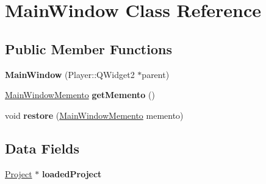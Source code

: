 \hypertarget{classMainWindow}{}\section{Main\+Window Class Reference}
\label{classMainWindow}
\subsection*{Public Member Functions}
\begin{DoxyCompactItemize}
\item 
\hypertarget{classMainWindow_a8fb7652fa5585fe4829311c33dd23742}{}{\bfseries Main\+Window} (Player\+::\+Q\+Widget2 $\ast$parent)\label{classMainWindow_a8fb7652fa5585fe4829311c33dd23742}

\item 
\hypertarget{classMainWindow_a4e03554cd341e25b1a1ed1aa00e68bb0}{}\hyperlink{classMainWindowMemento}{Main\+Window\+Memento} {\bfseries get\+Memento} ()\label{classMainWindow_a4e03554cd341e25b1a1ed1aa00e68bb0}

\item 
\hypertarget{classMainWindow_a8e99f6095537f949eff2aa8aa7ce12d1}{}void {\bfseries restore} (\hyperlink{classMainWindowMemento}{Main\+Window\+Memento} memento)\label{classMainWindow_a8e99f6095537f949eff2aa8aa7ce12d1}

\end{DoxyCompactItemize}
\subsection*{Data Fields}
\begin{DoxyCompactItemize}
\item 
\hypertarget{classMainWindow_a4b82e0cf5ec381f70ea067d629af7da3}{}\hyperlink{classProject}{Project} $\ast$ {\bfseries loaded\+Project}\label{classMainWindow_a4b82e0cf5ec381f70ea067d629af7da3}

\end{DoxyCompactItemize}
